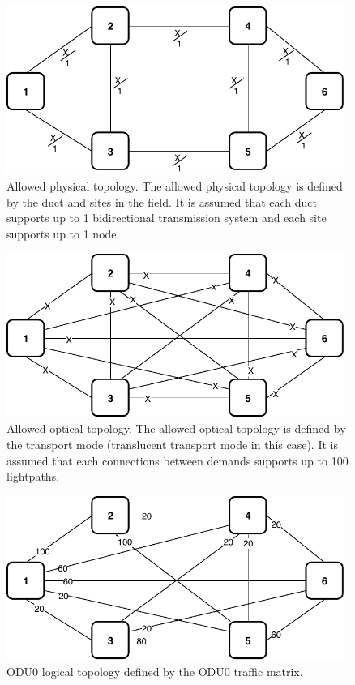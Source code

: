 \begin{figure}[h!]
\centering
\includegraphics[width=11cm]{sdf/ilp/translucent_survivability/figures/allowed_physical_topology}
\caption{Allowed physical topology. The allowed physical topology is defined by the duct and sites in the field. It is assumed that each duct supports up to 1 bidirectional transmission system and each site supports up to 1 node.}
\label{allowed3_physical_high}
\end{figure}

\begin{figure}[h!]
\centering
\includegraphics[width=11cm]{sdf/ilp/translucent_survivability/figures/allowed_optical_topology}
\caption{Allowed optical topology. The allowed optical topology is defined by the transport mode (translucent transport mode in this case). It is assumed that each connections between demands supports up to 100 lightpaths.}
\label{allowed3_optical_high}
\end{figure}
\newpage
\begin{figure}[h!]
\centering
\includegraphics[width=11cm]{sdf/ilp/translucent_survivability/figures/logical_topology_ODU0_high}
\caption{ODU0 logical topology defined by the ODU0 traffic matrix.}
\label{logical3_ODU0_high}
\end{figure}

